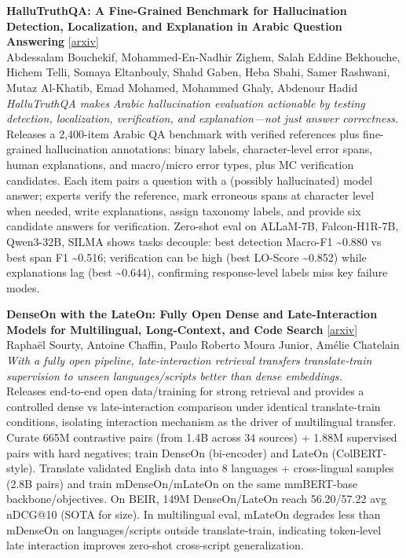 \documentclass[12pt,letterpaper]{article}
\begin{document}
\medskip

{\small\textbf{HalluTruthQA: A Fine-Grained Benchmark for Hallucination Detection, Localization, and Explanation in Arabic Question Answering}} {\scriptsize[\href{https://arxiv.org/abs/2607.20219}{arxiv}]}\\
{\scriptsize Abdessalam Bouchekif, Mohammed-En-Nadhir Zighem, Salah Eddine Bekhouche, Hichem Telli, Somaya Eltanbouly, Shahd Gaben, Heba Sbahi, Samer Rashwani, Mutaz Al-Khatib, Emad Mohamed, Mohammed Ghaly, Abdenour Hadid}\\

{\small\textit{HalluTruthQA makes Arabic hallucination evaluation actionable by testing detection, localization, verification, and explanation---not just answer correctness.}}\\[1pt]
{\footnotesize Releases a 2,400-item Arabic QA benchmark with verified references plus fine-grained hallucination annotations: binary labels, character-level error spans, human explanations, and macro/micro error types, plus MC verification candidates. Each item pairs a question with a (possibly hallucinated) model answer; experts verify the reference, mark erroneous spans at character level when needed, write explanations, assign taxonomy labels, and provide six candidate answers for verification. Zero-shot eval on ALLaM-7B, Falcon-H1R-7B, Qwen3-32B, SILMA shows tasks decouple: best detection Macro-F1 \textasciitilde{}0.880 vs best span F1 \textasciitilde{}0.516; verification can be high (best LO-Score \textasciitilde{}0.852) while explanations lag (best \textasciitilde{}0.644), confirming response-level labels miss key failure modes.}

\medskip

{\small\textbf{DenseOn with the LateOn: Fully Open Dense and Late-Interaction Models for Multilingual, Long-Context, and Code Search}} {\scriptsize[\href{https://arxiv.org/abs/2607.27178}{arxiv}]}\\
{\scriptsize Rapha\"el Sourty, Antoine Chaffin, Paulo Roberto Moura Junior, Am\'elie Chatelain}\\

{\small\textit{With a fully open pipeline, late-interaction retrieval transfers translate-train supervision to unseen languages/scripts better than dense embeddings.}}\\[1pt]
{\footnotesize Releases end-to-end open data/training for strong retrieval and provides a controlled dense vs late-interaction comparison under identical translate-train conditions, isolating interaction mechanism as the driver of multilingual transfer. Curate 665M contrastive pairs (from 1.4B across 34 sources) + 1.88M supervised pairs with hard negatives; train DenseOn (bi-encoder) and LateOn (ColBERT-style). Translate validated English data into 8 languages + cross-lingual samples (2.8B pairs) and train mDenseOn/mLateOn on the same mmBERT-base backbone/objectives. On BEIR, 149M DenseOn/LateOn reach 56.20/57.22 avg nDCG@10 (SOTA for size). In multilingual eval, mLateOn degrades less than mDenseOn on languages/scripts outside translate-train, indicating token-level late interaction improves zero-shot cross-script generalization.}
\end{document}
